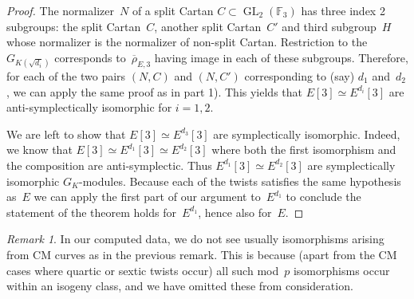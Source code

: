 \documentclass[12pt]{amsart}
\newcommand{\F}{\mathbb{F}}
\newcommand{\rhobar}{{\overline{\rho}}}
\newcommand{\GL}{\operatorname{GL}}
\numberwithin{equation}{section}
\theoremstyle{definition}
\theoremstyle{remark}
\newtheorem{remark}[theorem]{Remark}
\begin{document}
\begin{proof}
The normalizer~$N$ of a split Cartan $C \subset \GL_2(\F_3)$ has three index 2 subgroups: the split Cartan~$C$, another split Cartan~$C'$ and third subgroup~$H$ whose normalizer is the normalizer of non-split Cartan.
Restriction to the $G_{K(\sqrt{d_i})}$ corresponds to~$\rhobar_{E,3}$ having image in each of these subgroups. 
Therefore, for each of the two pairs $(N,C)$ and $(N,C')$ corresponding to (say) $d_1$ and~$d_2$, we can apply the same proof as in part 1). This yields that 
$E[3] \simeq E^{d_i}[3]$ are
anti-symplectically isomorphic for $i=1,2$.

We are left to show that $E[3] \simeq E^{d_3}[3]$ are symplectically isomorphic.
Indeed, we know that $E[3] \simeq E^{d_1}[3] \simeq E^{d_2}[3]$ where both the first isomorphism and the composition are anti-symplectic. Thus $E^{d_1}[3] \simeq E^{d_2}[3]$ are symplectically isomorphic $G_K$-modules. Because each of the twists satisfies the same hypothesis as~$E$ we can apply the first part of our argument to~$E^{d_1}$ to conclude the statement of the theorem holds for~$E^{d_1}$, hence also for~$E$.
\end{proof}

\begin{remark}
In our computed data, we do not see usually isomorphisms
arising from CM curves as in the previous remark. This is because
(apart from the CM cases where quartic or sextic twists occur) all
such mod~$p$ isomorphisms occur within an isogeny class, and we have
omitted these from consideration.
\end{remark}
\end{document}
